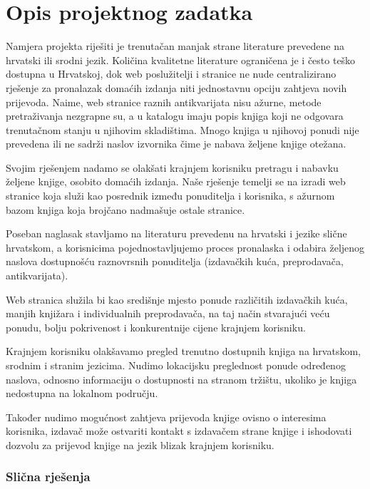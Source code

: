 \chapter{Opis projektnog zadatka}
		
		
		Namjera projekta riješiti je trenutačan manjak strane literature prevedene na hrvatski ili srodni jezik. Količina kvalitetne literature ograničena je i često teško dostupna u Hrvatskoj, dok web poslužitelji i stranice ne nude centralizirano rješenje za pronalazak domaćih izdanja niti jednostavnu opciju zahtjeva novih prijevoda. Naime, web stranice raznih antikvarijata nisu ažurne, metode pretraživanja nezgrapne su, a u katalogu imaju popis knjiga koji ne odgovara trenutačnom stanju u njihovim skladištima. Mnogo knjiga u njihovoj ponudi nije prevedena ili ne sadrži naslov izvornika čime je nabava željene knjige otežana.
		
		Svojim rješenjem nadamo se olakšati krajnjem korisniku pretragu i nabavku željene knjige, osobito domaćih izdanja. Naše rješenje temelji se na izradi web stranice koja služi kao posrednik između ponuditelja i korisnika, s ažurnom bazom knjiga koja brojčano nadmašuje ostale stranice. 
		
		Poseban naglasak stavljamo na literaturu prevedenu na hrvatski i jezike slične hrvatskom, a korisnicima pojednostavljujemo proces pronalaska i odabira željenog naslova dostupnošću raznovrsnih ponuditelja (izdavačkih kuća, preprodavača, antikvarijata).
		
		Web stranica služila bi kao središnje mjesto ponude različitih izdavačkih kuća, manjih knjižara i individualnih preprodavača, na taj način stvarajući veću ponudu, bolju pokrivenost i konkurentnije cijene krajnjem korisniku.
		
		Krajnjem korisniku olakšavamo pregled trenutno dostupnih knjiga na hrvatskom, srodnim i stranim jezicima. Nudimo lokacijsku preglednost ponude određenog naslova, odnosno informaciju o dostupnosti na stranom tržištu, ukoliko je knjiga nedostupna na lokalnom području.
		
		Također nudimo mogućnost zahtjeva prijevoda knjige ovisno o interesima korisnika, izdavač može ostvariti kontakt s izdavačem strane knjige i ishodovati dozvolu za prijevod knjige na jezik blizak krajnjem korisniku.\\
		
		
		
		\subsection{Slična rješenja}
		
